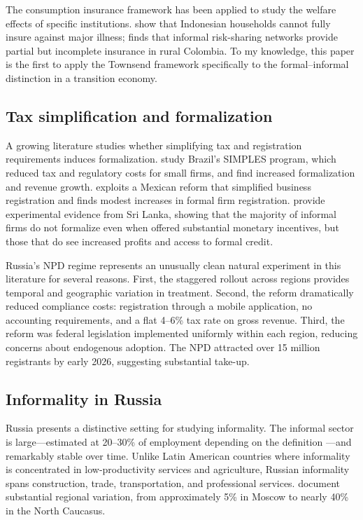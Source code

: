 \documentclass[12pt]{article}
\begin{document}
The consumption insurance framework has been applied to study the welfare effects of specific institutions. \citet{Gertler2002} show that Indonesian households cannot fully insure against major illness; \citet{Genoni2012} finds that informal risk-sharing networks provide partial but incomplete insurance in rural Colombia. To my knowledge, this paper is the first to apply the Townsend framework specifically to the formal--informal distinction in a transition economy.

\subsection{Tax simplification and formalization}

A growing literature studies whether simplifying tax and registration requirements induces formalization. \citet{Monteiro2012} study Brazil's SIMPLES program, which reduced tax and regulatory costs for small firms, and find increased formalization and revenue growth. \citet{Bruhn2011} exploits a Mexican reform that simplified business registration and finds modest increases in formal firm registration. \citet{deMelMcKenzieWoodruff2013} provide experimental evidence from Sri Lanka, showing that the majority of informal firms do not formalize even when offered substantial monetary incentives, but those that do see increased profits and access to formal credit.

Russia's NPD regime represents an unusually clean natural experiment in this literature for several reasons. First, the staggered rollout across regions provides temporal and geographic variation in treatment. Second, the reform dramatically reduced compliance costs: registration through a mobile application, no accounting requirements, and a flat 4--6\% tax rate on gross revenue. Third, the reform was federal legislation implemented uniformly within each region, reducing concerns about endogenous adoption. The NPD attracted over 15 million registrants by early 2026, suggesting substantial take-up.

\subsection{Informality in Russia}

Russia presents a distinctive setting for studying informality. The informal sector is large---estimated at 20--30\% of employment depending on the definition \citep{GimpelsonKapeliushnikov2014}---and remarkably stable over time. Unlike Latin American countries where informality is concentrated in low-productivity services and agriculture, Russian informality spans construction, trade, transportation, and professional services. \citet{LehmannZaiceva2013} document substantial regional variation, from approximately 5\% in Moscow to nearly 40\% in the North Caucasus.
\end{document}
